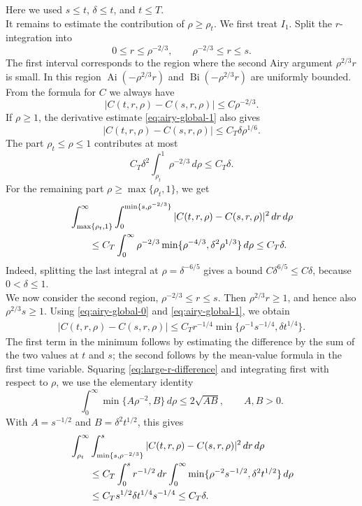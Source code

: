 \documentclass{article}
\newcommand{\Ai}{\operatorname{Ai}}
\newcommand{\Bi}{\operatorname{Bi}}
\begin{document}
Here we used \(s\le t\), \(\delta\le t\), and \(t\le T\).\\
It remains to estimate the contribution of \(\rho\ge \rho_t\).  We first treat
\(I_1\).  Split the \(r\)-integration into
\[
  0\le r\le \rho^{-2/3},
  \qquad
  \rho^{-2/3}\le r\le s.
\]
The first interval corresponds to the region where the second Airy argument
\(\rho^{2/3}r\) is small.  In this region \(\Ai(-\rho^{2/3}r)\) and
\(\Bi(-\rho^{2/3}r)\) are uniformly bounded.  From the formula for \(C\) we
always have
\[
 |C(t,r,\rho)-C(s,r,\rho)|\le C\rho^{-2/3}.
\]
If \(\rho\ge1\), the derivative estimate \eqref{eq:airy-global-1} also gives
\[
 |C(t,r,\rho)-C(s,r,\rho)|\le C_T\delta\rho^{1/6}.
\]
The part \(\rho_t\le\rho\le1\) contributes at most
\[
  C_T\delta^2\int_{\rho_t}^{1}\rho^{-2/3}\,d\rho\le C_T\delta.
\]
For the remaining part \(\rho\ge\max\{\rho_t,1\}\), we get
\begin{align}
&\int_{\max\{\rho_t,1\}}^\infty\int_0^{\min\{s,\rho^{-2/3}\}}
|C(t,r,\rho)-C(s,r,\rho)|^2\,dr\,d\rho             \notag\\
&\qquad\le
C_T\int_0^\infty
\rho^{-2/3}\min\{\rho^{-4/3},\delta^2\rho^{1/3}\}\,d\rho
\le C_T\delta.                                      \label{eq:I1-small-r}
\end{align}
Indeed, splitting the last integral at \(\rho=\delta^{-6/5}\) gives a bound
\(C\delta^{6/5}\le C\delta\), because \(0<\delta\le1\).\\
We now consider the second region, \(\rho^{-2/3}\le r\le s\).  Then
\(\rho^{2/3}r\ge1\), and hence also \(\rho^{2/3}s\ge1\).  Using
\eqref{eq:airy-global-0} and \eqref{eq:airy-global-1}, we obtain
\begin{align}
 |C(t,r,\rho)-C(s,r,\rho)|
 \le C_T r^{-1/4}
 \min\{\rho^{-1}s^{-1/4},\delta t^{1/4}\}.
 \label{eq:large-r-difference}
\end{align}
The first term in the minimum follows by estimating the difference by the sum
of the two values at \(t\) and \(s\); the second follows by the mean-value
formula in the first time variable.  Squaring \eqref{eq:large-r-difference}
and integrating first with respect to \(\rho\), we use the elementary identity
\[
  \int_0^\infty \min\{A\rho^{-2},B\}\,d\rho
  \le 2\sqrt{AB},
  \qquad A,B>0.
\]
With \(A=s^{-1/2}\) and \(B=\delta^2t^{1/2}\), this gives
\begin{align}
&\int_{\rho_t}^\infty\int_{\min\{s,\rho^{-2/3}\}}^s
|C(t,r,\rho)-C(s,r,\rho)|^2\,dr\,d\rho              \notag\\
&\qquad\le
C_T\int_0^s r^{-1/2}\,dr
\int_0^\infty \min\{\rho^{-2}s^{-1/2},\delta^2t^{1/2}\}\,d\rho
                                                                  \notag\\
&\qquad\le
C_T s^{1/2}\delta t^{1/4}s^{-1/4}
\le C_T\delta.                                      \label{eq:I1-large-r}
\end{align}
\end{document}
